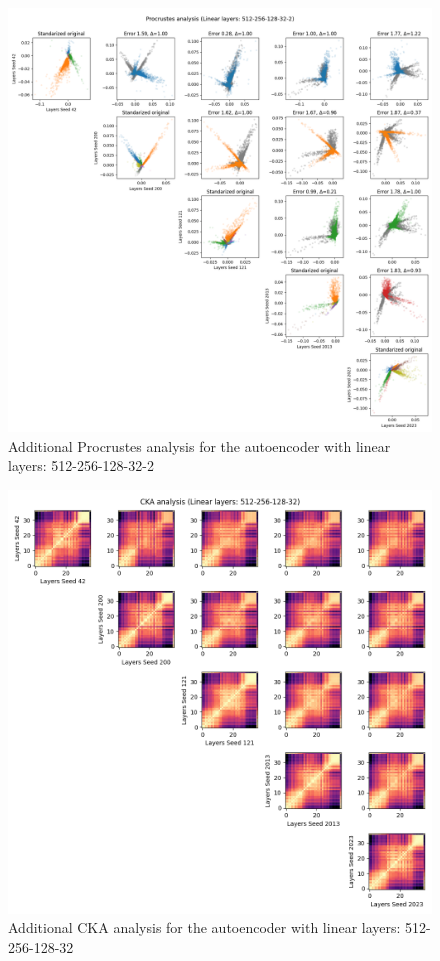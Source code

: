 \documentclass[../main.tex]{subfiles}
\begin{document}
%
\begin{figure}[ht!]
    \centering
    \includegraphics[width=\textwidth]{figures/rs/sim_ae/procrustes_512-256-128-32-2__42_200_121_2013_2023.png} 
    \caption{Additional Procrustes analysis for the autoencoder with linear layers: 512-256-128-32-2}
    \label{fig:extra_proc_ae_512_256_128_32_2}
\end{figure}
%
\begin{figure}[ht!]
     \centering
    \includegraphics[width=\textwidth]{figures/rs/sim_ae/cka_512-256-128-32__42_200_121_2013_2023.png} 
    \caption{Additional CKA analysis for the autoencoder with linear layers: 512-256-128-32}
    \label{fig:extra_cka_ae_512_256_128_32}
\end{figure}
\end{document}
